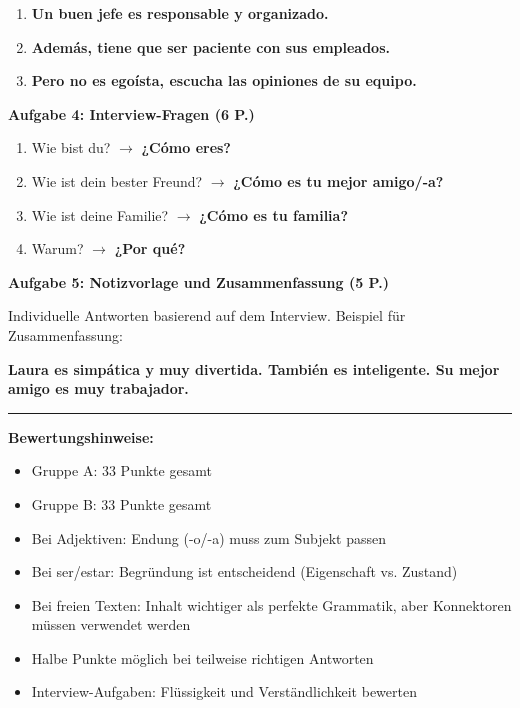\documentclass[11pt,a4paper]{article}
\newcommand{\lsg}[1]{\textcolor{loesung}{\textbf{#1}}}
\begin{document}
\begin{gruppeBbox}
\begin{enumerate}[leftmargin=2em, nosep]
    \item \lsg{Un buen jefe es responsable y organizado.}
    \item \lsg{Además, tiene que ser paciente con sus empleados.}
    \item \lsg{Pero no es egoísta, escucha las opiniones de su equipo.}
\end{enumerate}

\vspace{0.5em}
\textbf{Aufgabe 4: Interview-Fragen (6 P.)}

\begin{enumerate}[label=\alph*), leftmargin=2em, nosep]
    \item Wie bist du? $\rightarrow$ \lsg{¿Cómo eres?}
    \item Wie ist dein bester Freund? $\rightarrow$ \lsg{¿Cómo es tu mejor amigo/-a?}
    \item Wie ist deine Familie? $\rightarrow$ \lsg{¿Cómo es tu familia?}
    \item Warum? $\rightarrow$ \lsg{¿Por qué?}
\end{enumerate}

\vspace{0.5em}
\textbf{Aufgabe 5: Notizvorlage und Zusammenfassung (5 P.)}

Individuelle Antworten basierend auf dem Interview. Beispiel für Zusammenfassung:

\lsg{Laura es simpática y muy divertida. También es inteligente. Su mejor amigo es muy trabajador.}

\end{gruppeBbox}

\vspace{1em}
\hrule
\vspace{0.3em}

\textbf{Bewertungshinweise:}
\begin{itemize}[leftmargin=1.5em, nosep]
    \item Gruppe A: 33 Punkte gesamt
    \item Gruppe B: 33 Punkte gesamt
    \item Bei Adjektiven: Endung (-o/-a) muss zum Subjekt passen
    \item Bei ser/estar: Begründung ist entscheidend (Eigenschaft vs. Zustand)
    \item Bei freien Texten: Inhalt wichtiger als perfekte Grammatik, aber Konnektoren müssen verwendet werden
    \item Halbe Punkte möglich bei teilweise richtigen Antworten
    \item Interview-Aufgaben: Flüssigkeit und Verständlichkeit bewerten
\end{itemize}
\end{document}
